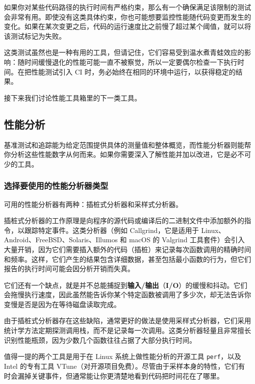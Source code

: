 \label{idx:1191}
如果你对某些代码路径的执行时间有严格约束，那么有一个确保满足该限制的测试会非常有用。即使没有这类具体约束，你也可能想要监控性能随代码变更而发生的变化。如果在某次变更之后，代码的运行速度比之前慢了超过某个阈值，就可以将该测试标记为失败。

这类测试虽然也是一种有用的工具，但请记住，它们容易受到温水煮青蛙效应的影响：随时间缓慢退化的性能可能一直不被察觉，所以一定要偶尔检查一下执行时间。在把性能测试引入 CI 时，务必始终在相同的环境中运行，以获得稳定的结果。

接下来我们讨论性能工具箱里的下一类工具。

\subsection{性能分析}

\label{idx:1192}
\label{idx:1193}
基准测试和追踪能为给定范围提供具体的测量值和整体概览，而性能分析器则能帮你分析这些性能数字从何而来。如果你需要深入了解性能并加以改进，它是必不可少的工具。

\subsubsection{选择要使用的性能分析器类型}

可用的性能分析器有两种：插桩式分析器和采样式分析器。

\label{idx:1194}
插桩式分析器的工作原理是向程序的源代码或编译后的二进制文件中添加额外的指令，以跟踪特定事件。这类分析器（例如 Callgrind，它是适用于 Linux、Android、FreeBSD、Solaris、Illumos 和 macOS 的 Valgrind 工具套件）会引入大量开销，因为它们需要插入额外的代码（插桩）来记录每次函数调用的精确时间和频率。这样，它们产生的结果包含详细数据，甚至包括最小函数的行为，但它们报告的执行时间可能会因分析开销而失真。

它们还有一个缺点，就是并不总能捕捉到\textbf{输入/输出}（\textbf{I/O}）的缓慢和抖动。它们会拖慢执行速度，因此虽然能告诉你某个特定函数被调用了多少次，却无法告诉你变慢是否是因为在等待磁盘读取完成。

由于插桩式分析器存在这些缺陷，通常更好的做法是使用采样式分析器，它们采用统计学方法定期探测调用栈，而不是记录每一次调用。这类分析器轻量且非常擅长识别性能瓶颈，因为少数几个函数往往占据了大部分执行时间。

值得一提的两个工具是用于在 Linux 系统上做性能分析的开源工具 \texttt{perf}，以及 Intel 的专有工具 VTune（对开源项目免费）。尽管由于采样本身的特性，它们有时会漏掉关键事件，但通常能让你更清楚地看到代码把时间花在了哪里。

